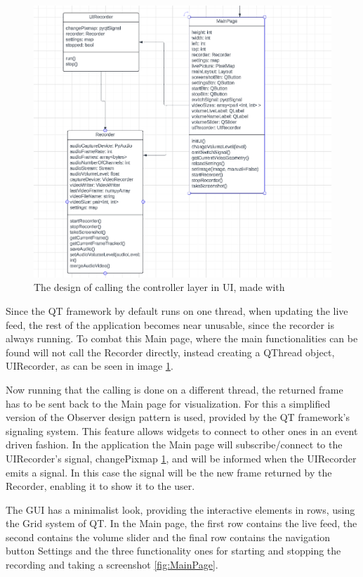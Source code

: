 \begin{figure}
    \centering
    \includegraphics[width=0.8\linewidth]{figures/UIRecorder.png}
    \caption{The design of calling the controller layer in UI, made with \cite{lucidchart}}
    \label{fig:UIRecorder}
\end{figure}

\par Since the QT framework by default runs on one thread, when updating the live feed, the rest of the application becomes near unusable, since the recorder is always running. To combat this Main page, where the main functionalities can be found will not call the Recorder directly, instead creating a QThread object, UIRecorder, as can be seen in image \ref{fig:UIRecorder}.
\par Now running that the calling is done on a different thread, the returned frame has to be sent back to the Main page for visualization. For this a simplified version of the Observer design pattern is used, provided by the QT framework's signaling system. This feature allows widgets to connect to other ones in an event driven fashion. In the application the Main page will subscribe/connect to the UIRecorder's signal, changePixmap \ref{fig:UIRecorder}, and will be informed when the UIRecorder emits a signal. In this case the signal will be the new frame returned by the Recorder, enabling it to show it to the user.
\par The GUI has a minimalist look, providing the interactive elements in rows, using the Grid system of QT. In the Main page, the first row contains the live feed, the second contains the volume slider and the final row contains the navigation button Settings and the three functionality ones for starting and stopping the recording and taking a screenshot \ref{fig:MainPage}.

